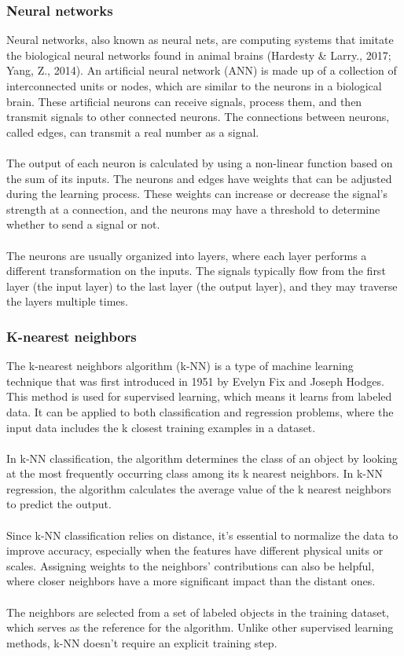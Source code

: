 \subsubsection{Neural networks}
Neural networks, also known as neural nets, are computing systems that imitate the biological neural networks 
found in animal brains (Hardesty \& Larry., 2017; Yang, Z., 2014). An artificial neural network (ANN) is made up 
of a collection of interconnected units or nodes, which are similar to the neurons in a biological brain. These 
artificial neurons can receive signals, process them, and then transmit signals to other connected neurons. The 
connections between neurons, called edges, can transmit a real number as a signal.\\\\
The output of each neuron is calculated by using a non-linear function based on the sum of its inputs. The neurons 
and edges have weights that can be adjusted during the learning process. These weights can increase or decrease 
the signal's strength at a connection, and the neurons may have a threshold to determine whether to send a signal 
or not.\\\\
The neurons are usually organized into layers, where each layer performs a different transformation on the inputs. 
The signals typically flow from the first layer (the input layer) to the last layer (the output layer), and they 
may traverse the layers multiple times.

\subsubsection{K-nearest neighbors}

The k-nearest neighbors algorithm (k-NN) is a type of machine learning technique that was first introduced in 1951 
by Evelyn Fix and Joseph Hodges. This method is used for supervised learning, which means it learns from labeled 
data. It can be applied to both classification and regression problems, where the input data includes the k closest 
training examples in a dataset.\\\\
In k-NN classification, the algorithm determines the class of an object by looking at the most frequently occurring 
class among its k nearest neighbors. In k-NN regression, the algorithm calculates the average value of the k nearest 
neighbors to predict the output.\\\\
Since k-NN classification relies on distance, it's essential to normalize the data to improve accuracy, especially 
when the features have different physical units or scales.  Assigning weights to the neighbors' contributions can 
also be helpful, where closer neighbors have a more significant impact than the distant ones.\\\\
The neighbors are selected from a set of labeled objects in the training dataset, which serves as the reference for 
the algorithm. Unlike other supervised learning methods, k-NN doesn't require an explicit training step.

